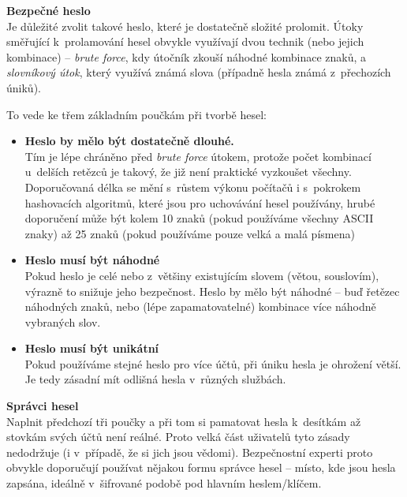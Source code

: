 
\textbf{Bezpečné heslo}\\
Je důležité zvolit takové heslo, které je dostatečně složité prolomit. Útoky směřující k~prolamování hesel obvykle využívají dvou technik (nebo jejich kombinace) -- \textit{brute force}, kdy útočník zkouší náhodné kombinace znaků, a \textit{slovníkový útok}, který využívá známá slova (případně hesla známá z~přechozích úniků).

To vede ke třem základním poučkám při tvorbě hesel:

\begin{itemize}
	\item \textbf{Heslo by mělo být dostatečně dlouhé.}\\
	Tím je lépe chráněno před \textit{brute force} útokem, protože počet kombinací u~delších retězců je takový, že již není praktické vyzkoušet všechny. Doporučovaná délka se mění s~růstem výkonu počítačů i s~pokrokem hashovacích algoritmů, které jsou pro uchovávání hesel používány, hrubé doporučení může být kolem 10 znaků (pokud používáme všechny ASCII znaky) až 25 znaků (pokud používáme pouze velká a malá písmena)

	\item \textbf{Heslo musí být náhodné}\\
	Pokud heslo je celé nebo z~většiny existujícím slovem (větou, souslovím), výrazně to snižuje jeho bezpečnost. Heslo by mělo být náhodné -- buď řetězec náhodných znaků, nebo (lépe zapamatovatelné) kombinace více náhodně vybraných slov.

	\item \textbf{Heslo musí být unikátní}\\
	Pokud používáme stejné heslo pro více účtů, při úniku hesla je ohrožení větší. Je tedy zásadní mít odlišná hesla v~různých službách. 

\end{itemize}

\textbf{Správci hesel}\\
Naplnit předchozí tři poučky a při tom si pamatovat hesla k~desítkám až stovkám svých účtů není reálné. Proto velká část uživatelů tyto zásady nedodržuje (i v~případě, že si jich jsou vědomi). Bezpečnostní experti proto obvykle doporučují používat nějakou formu správce hesel -- místo, kde jsou hesla zapsána, ideálně v~šifrované podobě pod hlavním heslem/klíčem.

